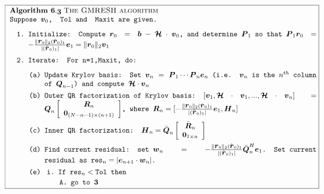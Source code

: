 \begin{figure}
\[\!\!\!\!\!\!\!\!\!\!\!\!
\fbox{
\begin{minipage} {146.0mm}
{\bf  Algorithm }${\bmi 6}$.${\bmi 3}$ {\sc The  GMRESH algorithm}\newline

\begin{tt}
\noindent Suppose ${\bmi v}_{0}$, { Tol} and  { Maxit} are given.
\begin{enumerate}
\item  Initialize: Compute ${\bmi r}_{0}={\bmi b}-{\CB H}\cdot {\bmi 
v}_{0}$,
and determine  ${\bmi P}_{1}$ so that ${\bmi P}_{1}{\bmi r}_{0}=  -\frac{ 
\| {\bmi  r}{}_{0} \|_{2}
(\hat{\bmi  r}_{0})_1}{ |(\hat{\bmi  r}_{0})_1|} {\bmi e}_{1}=  \| {\bmi  
r}{}_{0} \|_{2} {\bmi v}_{1}$

\item Iterate: For n=1,Maxit, do:
\begin{enumerate}
\item Update Krylov basis: Set  ${\bmi v}_{n}={\bmi P}_{1}\cdots {\bmi 
P}_{n} {\bmi e}_{n}$
 (i.e. ${\bmi v}_{n}$ is the $n^{th}$ column of ${\bmi Q}_{n-1}$) and 
compute ${\CB H}\cdot {\bmi v}_{n}$

\item Outer QR factorization of Krylov basis: $[{\bmi v}_{1},{\CB H}\cdot 
{\bmi v}_{1},...,{\CB H}\cdot {\bmi v}_{n}]={\bmi Q}_{n} \left[ 
\begin{array}{c} {\bmi R}_{n} \\ {\bf 0}_{(N-n-1) \times 
(n+1)}\end{array}  \right]$, where
${\bmi R}_{n}=[  -\frac{ \| {\bmi  r}{}_{0} \|_{2}
(\hat{\bmi  r}_{0})_1}{ |(\hat{\bmi  r}_{0})_1|}{\bmi e}_{1},  {\bmi 
H}_{n}]$

\item Inner QR factorization: ${\bmi H}_{n}=\bar{\bmi Q}_{n} 
\left[ \begin{array}{c} \bar{\bmi R}_{n} \\ {\bf 0}_{1 \times 
n}\end{array}  \right]$

\item Find current residual: set  ${\bmi w}_{n}= -\frac{ \| {\bmi  
r}{}_{0} \|_{2}
(\hat{\bmi  r}_{0})_1}{ |(\hat{\bmi  r}_{0})_1|} \bar{\bmi Q}^{H}_{n} 
{\bmi e}_{1}$. Set current residual as $\mbox{res}_{n} =|{\bmi 
e}_{n+1}\cdot 
{\bmi w}_{n}|$.

\item \begin{enumerate}
\item If $\mbox{res}_{n}< {\tt Tol}$ then
\begin{enumerate}
\item go to {\bf 3}
\end{enumerate}


\end{enumerate}
\end{enumerate}
\end{enumerate}
\end{tt}
\end{minipage}}\]
\end{figure}
